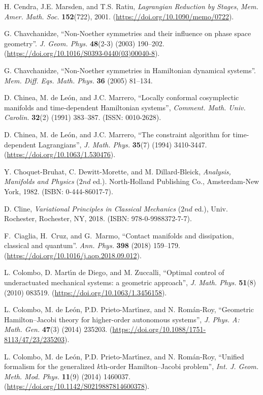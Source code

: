 \documentclass[12pt]{report}
\begin{document}
\begin{thebibliography}{999}
H. Cendra, J.E. Marsden, and T.S. Ratiu,
{\it Lagrangian Reduction by Stages},
{\sl Mem. Amer. Math. Soc.} {\bf 152}(722), 2001.
(\url{https://doi.org/10.1090/memo/0722}).

{\rm G. Chavchanidze},
``Non-Noether symmetries and their influence on phase space geometry''.
{\sl  J. Geom. Phys.} {\bf 48}(2-3) (2003) 190--202.
(\url{https://doi.org/10.1016/S0393-0440(03)00040-8}).

{\rm G. Chavchanidze},
``Non-Noether symmetries in Hamiltonian dynamical systems''.
{\sl Mem. Diff. Eqs. Math. Phys.} {\bf 36} (2005) 81--134.

D. Chinea, M. de Le\'on, and J.C. Marrero,
``Locally conformal cosymplectic manifolds and time-dependent Hamiltonian systems'',
{\sl  Comment. Math. Univ. Carolin.} {\bf 32}(2) (1991) 383--387.
(ISSN: 0010-2628).

D. Chinea, M. de Le\'on, and J.C. Marrero,
``The constraint algorithm for time-dependent Lagrangians'',
{\sl J. Math. Phys.} {\bf 35}(7) (1994) 3410-3447.
(\url{https://doi.org/10.1063/1.530476}).

Y. Choquet-Bruhat, C. Dewitt-Morette, and M. Dillard-Bleick, 
{\it Analysis, Manifolds and Physics} ($2nd$ ed.). North-Holland Publishing Co., Amsterdam-New York, 1982.
(ISBN: 0-444-86017-7).

D. Cline,
{\it Variational Principles in Classical Mechanics} ($2nd$ ed.),
Univ. Rochester, Rochester, NY, 2018.
(ISBN: 978-0-9988372-7-7).

F.~Ciaglia, H.~Cruz, and G.~Marmo,
``Contact manifolds and dissipation, classical and quantum''.
{\sl Ann. Phys.} {\bf 398} (2018) 159--179.
(\url{https://doi.org/10.1016/j.aop.2018.09.012}).

L. Colombo, D. Mart\'\i n de Diego, and M. Zuccalli,
``Optimal control of underactuated mechanical systems: a geometric approach'',
{\sl J. Math. Phys.} \textbf{51}(8) (2010) 083519.
(\url{https://doi.org/10.1063/1.3456158}).

L. Colombo, M. de Le\'on, P.D. Prieto-Mart\'\i nez, and N. Rom\'an-Roy,
``Geometric Hamilton--Jacobi theory for higher-order autonomous systems'',
{\sl J. Phys. A: Math. Gen.} {\bf 47}(3) (2014) 235203.
(\url{https://doi.org/10.1088/1751-8113/47/23/235203}).

L. Colombo, M. de Le\'on, P.D. Prieto-Mart\'\i nez, and N. Rom\'an-Roy,
``Unified formalism for the generalized $k$th-order Hamilton--Jacobi problem'',
{\sl Int. J. Geom. Meth. Mod. Phys.} {\bf 11}(9) (2014) 1460037.
(\url{https://doi.org/10.1142/S0219887814600378}).


\end{thebibliography}
\end{document}
